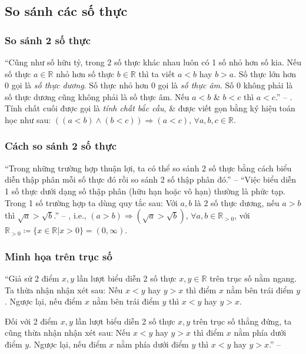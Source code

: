 \documentclass[oneside]{book}
\numberwithin{equation}{section}
\begin{document}
\subsection{So sánh các số thực}

\subsubsection{So sánh 2 số thực}
``Cũng như số hữu tỷ, trong 2 số thực khác nhau luôn có 1 số nhỏ hơn số kia. Nếu số thực $a\in\mathbb{R}$ nhỏ hơn số thực $b\in\mathbb{R}$ thì ta viết $a < b$ hay $b > a$. Số thực lớn hơn $0$ gọi là \textit{số thực dương}. Số thực nhỏ hơn $0$ gọi là \textit{số thực âm}. Số $0$ không phải là số thực dương cũng không phải là số thực âm. Nếu $a < b$ \& $b < c$ thì $a < c$.'' -- \cite[p. 40]{SGK_Toan_7_Canh_Dieu_tap_1}. Tính chất cuối được gọi là \textit{tính chất bắc cầu}, \& được viết gọn bằng ký hiệu toán học như sau: $((a < b)\land(b < c))\Rightarrow(a < c)$, $\forall a,b,c\in\mathbb{R}$.

\subsubsection{Cách so sánh 2 số thực}
``Trong những trường hợp thuận lợi, ta có thể so sánh 2 số thực bằng cách biểu diễn thập phân mỗi số thực đó rồi so sánh 2 số thập phân đó.'' -- \cite[p. 40]{SGK_Toan_7_Canh_Dieu_tap_1} ``Việc biểu diễn 1 số thực dưới dạng số thập phân (hữu hạn hoặc vô hạn) thường là phức tạp. Trong 1 số trường hợp ta dùng quy tắc sau: Với $a,b$ là 2 số thực dương, nếu $a > b$ thì $\sqrt{a} > \sqrt{b}$.'' -- \cite[p. 41]{SGK_Toan_7_Canh_Dieu_tap_1}, i.e., $(a > b)\Rightarrow(\sqrt{a} > \sqrt{b})$, $\forall a,b\in\mathbb{R}_{> 0}$, với $\mathbb{R}_{> 0}\coloneqq\{x\in\mathbb{R}|x > 0\} = (0,\infty)$.

\subsubsection{Minh họa trên trục số}
``Giả sử 2 điểm $x,y$ lần lượt biểu diễn 2 số thực $x,y\in\mathbb{R}$ trên trục số nằm ngang. Ta thừa nhận nhận xét sau: Nếu $x < y$ hay $y > x$ thì điểm $x$ nằm bên trái điểm $y$. Ngược lại, nếu điểm $x$ nằm bên trái điểm $y$ thì $x < y$ hay $y > x$.

Đối với 2 điểm $x,y$ lần lượt biểu diễn 2 số thực $x,y$ trên trục số thẳng đứng, ta cũng thừa nhận nhận xét sau: Nếu $x < y$ hay $y > x$ thì điểm $x$ nằm phía dưới điểm $y$. Ngược lại, nếu điểm $x$ nằm phía dưới điểm $y$ thì $x < y$ hay $y > x$.'' -- \cite[p. 41]{SGK_Toan_7_Canh_Dieu_tap_1}
\end{document}
